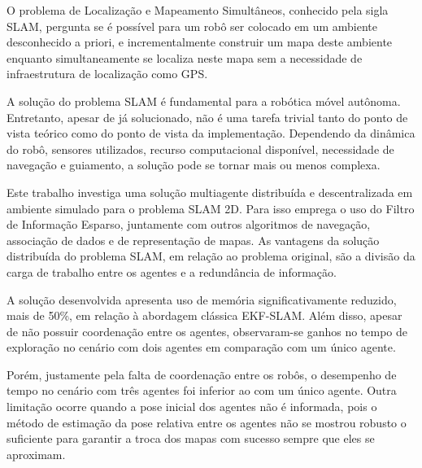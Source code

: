 O problema de Localização e Mapeamento Simultâneos, conhecido pela sigla SLAM, pergunta se é possível para um robô ser colocado em um ambiente 
desconhecido a priori, e incrementalmente construir um mapa deste 
ambiente enquanto simultaneamente se localiza neste mapa sem a 
necessidade de infraestrutura de localização como GPS.

A solução do problema SLAM é fundamental para a robótica móvel 
autônoma. Entretanto, apesar de já solucionado, não é uma tarefa trivial 
tanto do ponto de vista teórico como do ponto de vista da implementação. 
Dependendo da dinâmica do robô, sensores utilizados, recurso 
computacional disponível, necessidade de navegação e guiamento, a solução 
pode se tornar mais ou menos complexa.

Este trabalho investiga uma solução multiagente distribuída e descentralizada em ambiente simulado 
para o problema SLAM 2D. Para isso emprega o uso do Filtro de Informação 
Esparso, juntamente com outros algoritmos de navegação, associação de 
dados e de representação de mapas. As vantagens da solução distribuída do 
problema SLAM, em relação ao problema original, são a divisão da carga 
de trabalho entre os agentes e a redundância de informação.

A solução desenvolvida apresenta uso de memória significativamente 
reduzido, mais de 50\%, em relação à abordagem clássica EKF-SLAM. 
Além disso, apesar de não possuir coordenação entre os agentes, 
observaram-se ganhos no tempo de exploração no cenário com dois agentes 
em comparação com um único agente.

Porém, justamente pela falta de 
coordenação entre os robôs, o desempenho de tempo no cenário com 
três agentes foi inferior ao com um único agente. Outra limitação ocorre 
quando a pose inicial dos agentes não é informada, pois o método de 
estimação da pose relativa entre os agentes não se mostrou robusto o 
suficiente para garantir a troca dos mapas com sucesso sempre que eles se 
aproximam.